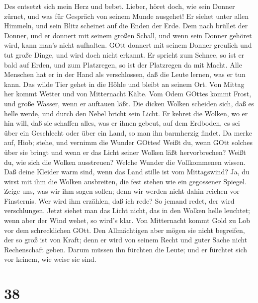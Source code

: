  Des entsetzt sich mein Herz und bebet.  Lieber,
höret doch, wie sein Donner zürnet, und was für Gespräch von seinem
Munde ausgehet!  Er siehet unter allen Himmeln, und sein
Blitz scheinet auf die Enden der Erde.  Dem nach brüllet der
Donner, und er donnert mit seinem großen Schall, und wenn sein Donner
gehöret wird, kann man's nicht aufhalten.  GOtt donnert mit
seinem Donner greulich und tut große Dinge, und wird doch nicht erkannt.
 Er spricht zum Schnee, so ist er bald auf Erden, und zum
Platzregen, so ist der Platzregen da mit Macht.  Alle
Menschen hat er in der Hand als verschlossen, daß die Leute lernen, was
er tun kann.  Das wilde Tier gehet in die Höhle und bleibt
an seinem Ort.  Von Mittag her kommt Wetter und von
Mitternacht Kälte.  Vom Odem GOttes kommt Frost, und große
Wasser, wenn er auftauen läßt.  Die dicken Wolken scheiden
sich, daß es helle werde, und durch den Nebel bricht sein Licht.
 Er kehret die Wolken, wo er hin will, daß sie schaffen
alles, was er ihnen gebeut, auf dem Erdboden,  es sei über
ein Geschlecht oder über ein Land, so man ihn barmherzig findet.
 Da merke auf, Hiob; stehe, und vernimm die Wunder GOttes!
 Weißt du, wenn GOtt solches über sie bringt und wenn er
das Licht seiner Wolken läßt hervorbrechen?  Weißt du, wie
sich die Wolken ausstreuen? Welche Wunder die Vollkommenen wissen.
 Daß deine Kleider warm sind, wenn das Land stille ist vom
Mittagswind?  Ja, du wirst mit ihm die Wolken ausbreiten,
die fest stehen wie ein gegossener Spiegel.  Zeige uns, was
wir ihm sagen sollen; denn wir werden nicht dahin reichen vor
Finsternis.  Wer wird ihm erzählen, daß ich rede? So jemand
redet, der wird verschlungen.  Jetzt siehet man das Licht
nicht, das in den Wolken helle leuchtet; wenn aber der Wind wehet, so
wird's klar.  Von Mitternacht kommt Gold zu Lob vor dem
schrecklichen GOtt.  Den Allmächtigen aber mögen sie nicht
begreifen, der so groß ist von Kraft; denn er wird von seinem Recht und
guter Sache nicht Rechenschaft geben.  Darum müssen ihn
fürchten die Leute; und er fürchtet sich vor keinem, wie weise sie sind.

\hypertarget{section-37}{%
\section{38}\label{section-37}}

